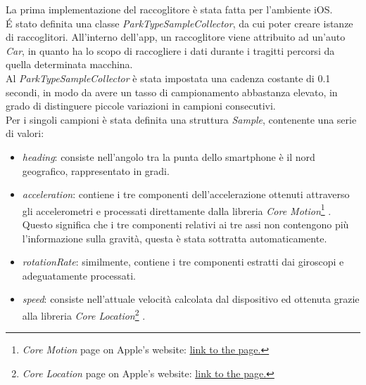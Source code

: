La prima implementazione del raccoglitore è stata fatta per l'ambiente iOS.\\
\'E stato definita una classe \emph{ParkTypeSampleCollector}, da cui poter creare
istanze di raccoglitori. All'interno dell'app, un raccoglitore viene attribuito ad
un'auto \emph{Car}, in quanto ha lo scopo di raccogliere i dati durante i tragitti 
percorsi da quella determinata macchina.\\
Al \emph{ParkTypeSampleCollector} è stata impostata una cadenza costante di 0.1
secondi, in modo da avere un tasso di campionamento abbastanza elevato, in grado
di distinguere piccole variazioni in campioni consecutivi.\\
Per i singoli campioni è stata definita una struttura \emph{Sample}, contenente
una serie di valori:
\begin{itemize}
    \item \emph{heading}: consiste nell'angolo tra la punta dello smartphone è il nord geografico,
    rappresentato in gradi.
    \item \emph{acceleration}: contiene i tre componenti dell'accelerazione ottenuti attraverso 
    gli accelerometri e processati direttamente dalla libreria \emph{Core Motion}\footnote{\emph{Core Motion} page on Apple's website: 
    \href{https://developer.apple.com/documentation/coremotion}{\underline{link to the page.}}}
    \cite{using_core_motion}. 
    Questo significa che i tre componenti relativi ai tre assi non contengono più
    l'informazione sulla gravità, questa è stata sottratta automaticamente.
    \item \emph{rotationRate}: similmente, contiene i tre componenti estratti dai giroscopi
    e adeguatamente processati.
    \item \emph{speed}: consiste nell'attuale velocità calcolata dal dispositivo ed ottenuta 
    grazie alla libreria \emph{Core Location}\footnote{\emph{Core Location} page on Apple's website: 
    \href{https://developer.apple.com/documentation/corelocation}{\underline{link to the page.}}}
    \cite{introduction_core_location}.
\end{itemize}


